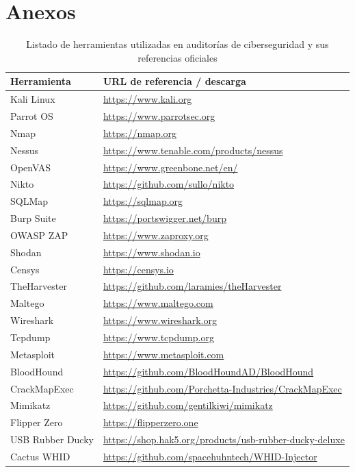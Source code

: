 \documentclass[a4paper, 10pt]{article}
\begin{document}
\clearpage







\section{Anexos}

\begin{table}[H]
\centering
\begin{tabular}{|p{4cm}|p{8cm}|}
\hline
\textbf{Herramienta} & \textbf{URL de referencia / descarga} \\
\hline
Kali Linux & \url{https://www.kali.org} \\
Parrot OS & \url{https://www.parrotsec.org} \\
Nmap & \url{https://nmap.org} \\
Nessus & \url{https://www.tenable.com/products/nessus} \\
OpenVAS & \url{https://www.greenbone.net/en/} \\
Nikto & \url{https://github.com/sullo/nikto} \\
SQLMap & \url{https://sqlmap.org} \\
Burp Suite & \url{https://portswigger.net/burp} \\
OWASP ZAP & \url{https://www.zaproxy.org} \\
Shodan & \url{https://www.shodan.io} \\
Censys & \url{https://censys.io} \\
TheHarvester & \url{https://github.com/laramies/theHarvester} \\
Maltego & \url{https://www.maltego.com} \\
Wireshark & \url{https://www.wireshark.org} \\
Tcpdump & \url{https://www.tcpdump.org} \\
Metasploit & \url{https://www.metasploit.com} \\
BloodHound & \url{https://github.com/BloodHoundAD/BloodHound} \\
CrackMapExec & \url{https://github.com/Porchetta-Industries/CrackMapExec} \\
Mimikatz & \url{https://github.com/gentilkiwi/mimikatz} \\
Flipper Zero & \url{https://flipperzero.one} \\
USB Rubber Ducky & \url{https://shop.hak5.org/products/usb-rubber-ducky-deluxe} \\
Cactus WHID & \url{https://github.com/spacehuhntech/WHID-Injector} \\
\hline
\end{tabular}
\caption{Listado de herramientas utilizadas en auditorías de ciberseguridad y sus referencias oficiales}
\end{table}


\clearpage
\end{document}
